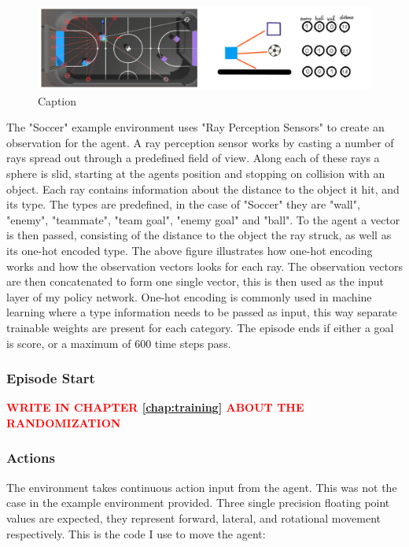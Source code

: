 \begin{figure}[H]
    \centering
    \includegraphics[width=1\linewidth]{figures/ray_sensor.png}
    \caption{Caption}
    \label{fig:ray_sensor}
\end{figure}
\noindent
The "Soccer" example environment uses "Ray Perception Sensors" to create an observation for the agent. A ray perception sensor works by casting a number of rays spread out through a predefined field of view. Along each of these rays a sphere is slid, starting at the agents position and stopping on collision with an object. Each ray contains information about the distance to the object it hit, and its type. The types are predefined, in the case of "Soccer" they are "wall", "enemy", "teammate", "team goal", "enemy goal" and "ball". To the agent a vector is then passed, consisting of the distance to the object the ray struck, as well as its one-hot encoded type. The above figure illustrates how one-hot encoding works and how the observation vectors looks for each ray. The observation vectors are then concatenated to form one single vector, this is then used as the input layer of my policy network. One-hot encoding is commonly used in machine learning where a type information needs to be passed as input, this way separate trainable weights are present for each category. The episode ends if either a goal is score, or a maximum of $600$ time steps pass.

\subsubsection{Episode Start}\label{subsubsec:ip:environment:impl:start}
\textcolor{red}{\textbf{WRITE IN CHAPTER \ref{chap:training} ABOUT THE RANDOMIZATION}}

\subsubsection{Actions}\label{subsubsec:ip:environment:impl:actions}
The environment takes continuous action input from the agent. This was not the case in the example environment provided. Three single precision floating point values are expected, they represent forward, lateral, and rotational movement respectively. This is the  code I use to move the agent:

